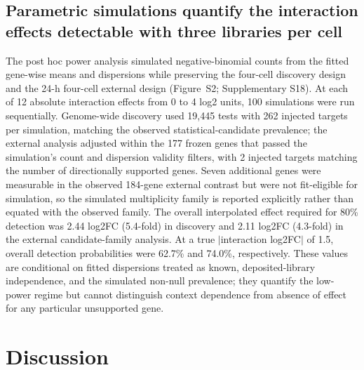 \documentclass[11pt]{article}
\begin{document}
\subsection{Parametric simulations quantify the interaction effects detectable with three libraries per cell}

The post hoc power analysis simulated negative-binomial counts from the fitted gene-wise means and dispersions while preserving the four-cell discovery design and the 24-h four-cell external design (Figure~S2; Supplementary S18). At each of 12 absolute interaction effects from 0 to 4 log2 units, 100 simulations were run sequentially. Genome-wide discovery used 19,445 tests with 262 injected targets per simulation, matching the observed statistical-candidate prevalence; the external analysis adjusted within the 177 frozen genes that passed the simulation's count and dispersion validity filters, with 2 injected targets matching the number of directionally supported genes. Seven additional genes were measurable in the observed 184-gene external contrast but were not fit-eligible for simulation, so the simulated multiplicity family is reported explicitly rather than equated with the observed family. The overall interpolated effect required for 80\% detection was 2.44 log2FC (5.4-fold) in discovery and 2.11 log2FC (4.3-fold) in the external candidate-family analysis. At a true $|$interaction log2FC$|$ of 1.5, overall detection probabilities were 62.7\% and 74.0\%, respectively. These values are conditional on fitted dispersions treated as known, deposited-library independence, and the simulated non-null prevalence; they quantify the low-power regime but cannot distinguish context dependence from absence of effect for any particular unsupported gene.

\section{Discussion}
\end{document}
